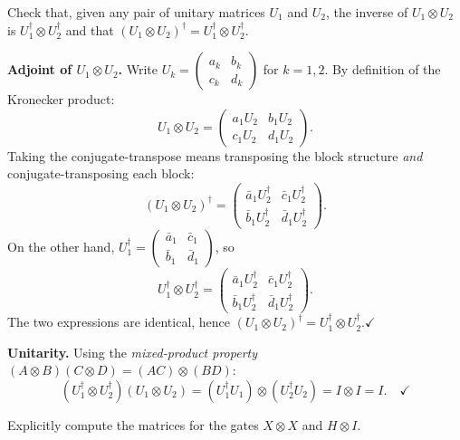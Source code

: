\documentclass{ceri/sty/rapport}
\newcounter{exercice}[section]
\begin{document}
\begin{exercice}[p.~27]
Check that, given any pair of unitary matrices $U_1$ and $U_2$, the inverse
of $U_1 \otimes U_2$ is $U_1^\dagger \otimes U_2^\dagger$ and that
$(U_1 \otimes U_2)^\dagger = U_1^\dagger \otimes U_2^\dagger$.
\end{exercice}

\begin{solution}
\textbf{Adjoint of $U_1\otimes U_2$.}
Write $U_k=\begin{pmatrix}a_k&b_k\\c_k&d_k\end{pmatrix}$ for $k=1,2$.
By definition of the Kronecker product:
\[
  U_1\otimes U_2
  =\begin{pmatrix}a_1 U_2 & b_1 U_2\\c_1 U_2 & d_1 U_2\end{pmatrix}.
\]
Taking the conjugate-transpose means transposing the block structure \emph{and}
conjugate-transposing each block:
\[
  (U_1\otimes U_2)^\dagger
  =\begin{pmatrix}\bar a_1 U_2^\dagger & \bar c_1 U_2^\dagger\\
                  \bar b_1 U_2^\dagger & \bar d_1 U_2^\dagger\end{pmatrix}.
\]
On the other hand,
$U_1^\dagger=\begin{pmatrix}\bar a_1 & \bar c_1\\\bar b_1 & \bar d_1\end{pmatrix}$,
so
\[
  U_1^\dagger\otimes U_2^\dagger
  =\begin{pmatrix}\bar a_1 U_2^\dagger & \bar c_1 U_2^\dagger\\
                  \bar b_1 U_2^\dagger & \bar d_1 U_2^\dagger\end{pmatrix}.
\]
The two expressions are identical, hence
$(U_1\otimes U_2)^\dagger = U_1^\dagger\otimes U_2^\dagger$.\quad$\checkmark$

\medskip\noindent
\textbf{Unitarity.}
Using the \emph{mixed-product property} $(A\otimes B)(C\otimes D)=(AC)\otimes(BD)$:
\[
  (U_1^\dagger\otimes U_2^\dagger)(U_1\otimes U_2)
  =(U_1^\dagger U_1)\otimes(U_2^\dagger U_2)
  =I\otimes I=I.\quad\checkmark
\]
\end{solution}

\begin{exercice}[p.~28]
Explicitly compute the matrices for the gates $X \otimes X$ and $H \otimes I$.
\end{exercice}
\end{document}
